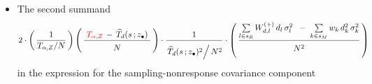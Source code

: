 \begin{itemize}
\begin{itemize}
        \begin{eqnarray*}
        E_{Y}\!\left[\;
            \left.
            \widetilde{T}_{\alpha,Y} \overset{{\color{white}.}}{-} \widehat{T}^{\textnormal{(HT)}}_{\alpha,Y}
            \;\right\vert\,
            s,s_{R},\Zdot,\Xobs
            \,\right]
        & = &
            \underset{k\in{\color{red}s_{M}}}{\sum}\,w_{k}\,d_{k}\,
            E_{Y}\!\left[\;
                \left.
                Y^{*}_{k} \overset{{\color{white}.}}{-} Y_{k}
                \;\right\vert\,
                s,s_{R},\Zdot,\Xobs
                \,\right]
        \end{eqnarray*}
        This harks back to our earlier remark (Remark \ref{remarkSmallUnitBias}) that,
        in practice, we would like to choose an imputation strategy such that
        \begin{equation*}
        E_{Y}\!\left[\;
            \left.
            Y^{*}_{k} \overset{{\color{white}.}}{-} Y_{k}
            \;\right\vert\,
            s,s_{R},\Zdot,\Xobs
            \,\right]
        \;\; \approx \;\;
            0,
        \quad
        \textnormal{for each \,$k \in s_{M}$}
        \end{equation*}
        See the paragraph after Equation (5.2), p.175, \cite{Beaumont2011}.
        \vskip 0.3cm
    \item
        The second summand
        \begin{equation*}
        2
        \cdot
        \left(\,
            \dfrac{1}{T_{\alpha,Z} \slash N}
            \,\right)
        \left(\,
            \dfrac{
                {\color{white}.}
                {\color{red}T_{\alpha,Z}} \,-\, \widehat{T}_{d}(s\,;\zdot)
                {\color{white}.}
                }{
                \overset{{\color{white}.}}{
                    N
                    }
                }           
            \,\right)
        \cdot
        \dfrac{
            1
            }{
            \overset{{\color{white}.}}{
                \left. \widehat{T}_{d}(s\,;\zdot)^{2} \right\slash N^{2}
                }
            }
        \cdot
        \left(\,
            \dfrac{
                \underset{l \in s_{R}}{\sum}\,
                W^{(+)}_{d,l}\,d_{l}\,\sigma_{l}^{2}
                \;\;-\;
                \underset{k \in s_{M}}{\sum}\,
                w_{k}\,d_{k}^{2}\,\sigma_{k}^{2}
                }{
                \overset{{\color{white}.}}{N^{2}}                
                }
            \,\right)
        \end{equation*}
        in the expression for the sampling-nonresponse covariance component

\end{itemize}
\end{itemize}
